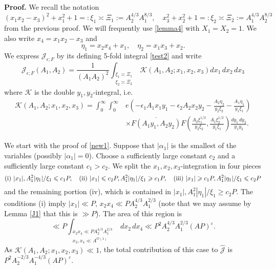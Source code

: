 \documentclass[11pt]{amsart}
\theoremstyle{plain}
\numberwithin{equation}{section}
\theoremstyle{definition}
\renewcommand{\geq}{\geqslant}
\renewcommand{\leq}{\leqslant}
\begin{document}
\textbf{Proof.}  We recall the notation
$$ (x_1x_2 - x_3)^2 + x_1^2 + 1 =: \xi_1  \asymp \Xi_1 := A_2^{4/3} A_1^{8/3}, 
\quad  x_3^2 + x_2^2 + 1 =:\xi_2 \asymp \Xi_2 := A_1^{4/3} A_2^{8/3}
$$
from the previous proof. We will frequently use \eqref{lemma4} with $X_1 = X_2 = 1$. 
We also write $x_4 = x_1x_2 - x_3$ and 
$$\eta_1 = x_2x_4 + x_1, \quad \eta_2 = x_1x_3 + x_2.$$
We   express  $ \mathcal{J}_{\epsilon; F}$ by its defining 5-fold integral \eqref{test2} and write
$$\mathcal{J}_{\epsilon; F}(A_1, A_2) =  \frac{1}{(A_1A_2)^2}\int_{\substack{\xi_1 \asymp \Xi_1\\ \xi_2 \asymp \Xi_2}} \mathcal{K}(A_1, A_2; x_1, x_2, x_3) dx_1\, dx_2\, dx_3$$
 where $\mathcal{K}$  is the double $y_1, y_2$-integral, i.e.
 \begin{equation}\label{added-int}
 \begin{split}
 \mathcal{K}(A_1, A_2; x_1, x_2, x_3)  = \int_0^{\infty}\int_0^{\infty}  &e\left(-\epsilon_1 A_1x_1y_1 - \epsilon_2 A_2x_2y_2 -\frac{A_2\eta_2}{y_2\xi_2}   -\frac{A_1\eta_1}{y_1\xi_1}   \right)\\
 & \times \overline{F(A_1y_1, A_2 y_2)}   F\left(\frac{A_2\xi_1^{1/2}}{y_2\xi_2} , \frac{A_1\xi_2^{1/2}}{y_1\xi_1}  \right)   \frac{dy_1\, dy_2}{y_1y_2}. 
\end{split}
 \end{equation}
 
 We start with the proof of \eqref{new1}.  Suppose that $|\alpha_1|$ is the smallest of the variables (possibly $|\alpha_1| = 0$). Choose a sufficiently large constant $c_2$ and a sufficiently large constant $c_1 > c_2$. We split the $x_1, x_2, x_3$-integration in four pieces 
$$ {\rm (i)}\,\,  |x_1|, A_1^2 |\eta_1|/\xi_1 \leq c_1 P, \quad {\rm (ii)}\,\, |x_1| \leq c_2P, A_1^2 |\eta_1|/\xi_1 \geq c_1 P, \quad {\rm (iii)} \,\,|x_1| \geq c_1P, A_1^2 |\eta_1|/\xi_1 \leq c_2P$$
and the remaining portion (iv), which is contained in $
 |x_1|, A_1^2 |\eta_1|/\xi_1 \geq c_2 P$. The conditions (i) imply $|x_1| \ll P$, $x_2x_4 \ll P A_2^{4/3} A_1^{2/3}$ (note that we may assume by Lemma \ref{J1} that this is  $\gg P$). The area of this region is
 $$\ll P \int_{\substack{x_2x_4 \ll P A_2^{4/3} A_1^{2/3}\\ x_2, x_4 \ll A^{O(1)}}} dx_2\, dx_4 \ll   P^2A_2^{4/3} A_1^{2/3} (AP)^{\varepsilon}.$$
As  $\mathcal{K}(A_1, A_2; x_1, x_2, x_3) \ll 1$, the total contribution of this case to $\widehat{\mathcal{J}}$ is $P^2A_2^{-2/3} A_1^{-4/3} (AP)^{\varepsilon}$. 
\end{document}
